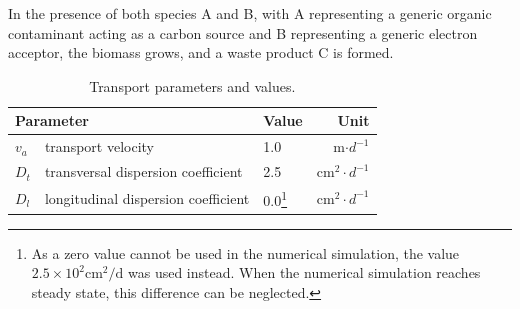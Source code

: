 In the presence of both species A and B, with A representing a generic organic
contaminant acting as a carbon source and B representing a generic electron
acceptor, the biomass grows, and a waste product C is formed.
\begin{table}[!th]
\caption{Transport parameters and values.}
\label{tab:monodtransport}
\centering
\begin{minipage}{\linewidth}
\renewcommand{\thefootnote}{\thempfootnote}
\centering
\begin{tabular}{lllr}
\hline
\multicolumn{2}{l}{\bf{Parameter}} & \bf{Value} & \bf{Unit}\\
\hline
$v_a$ & transport velocity & 1.0 & m$\cdot d^{-1}$\\
$D_t$ & transversal dispersion coefficient & 2.5 & cm$^2 \cdot d^{-1}$ \\
$D_l$ & longitudinal dispersion coefficient & 0.0\footnote{\centering
As a zero value cannot be used in the numerical simulation, the value
$2.5\times10^{2} \mathrm{cm^{2}/d}$ was used instead. When the numerical
simulation reaches steady state, this difference can be neglected. } & cm$^2 \cdot d^{-1}$ \\
\hline
\end{tabular}
\end{minipage}
\end{table}



